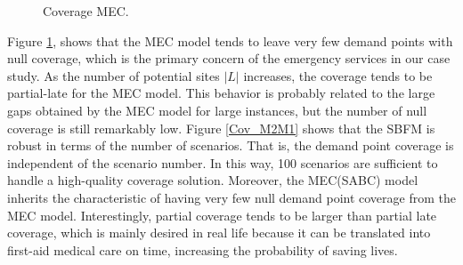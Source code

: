 \begin{figure}[H]
\hspace{0.4cm}%
\vspace{0.4cm}
\caption{Coverage MEC.}
\label{Cov_MEC}
\end{figure}

   


Figure \ref{Cov_MEC}, shows that the MEC model tends to leave very few demand points with null coverage, which is the primary concern of the emergency services in our case study. As the number of potential sites $|L|$ increases, the coverage tends to be partial-late for the MEC model. This behavior is probably related to the large gaps obtained by the MEC model for large instances, but the number of null coverage is still remarkably low.  
Figure \ref{Cov_M2M1} shows that the SBFM is robust in terms of the number of scenarios. That is, the demand point coverage is independent of the scenario number. In this way, 100 scenarios are sufficient to handle a high-quality coverage solution. Moreover, the MEC(SABC) model inherits the characteristic of having very few null demand point coverage from the MEC model. Interestingly, partial coverage tends to be larger than partial late coverage, which is mainly desired in real life because it can be translated into first-aid medical care on time, increasing the probability of saving lives. 

